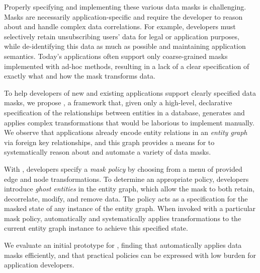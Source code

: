 Properly specifying and implementing these various data masks is challenging. Masks are necessarily
application-specific and require the developer to reason about and handle complex data correlations.
For example, developers must selectively retain unsubscribing users' data for legal or application
purposes, while de-identifying this data as much as possible and maintaining application semantics.
Today's applications often support only coarse-grained masks implemented with ad-hoc methods,
resulting in a lack of a clear specification of exactly what and how the mask transforms data.

To help developers of new and existing applications support clearly specified data masks, we propose
\sys, a framework that, given only a high-level, declarative specification of the relationships
between entities in a database, generates and applies complex transformations that would be
laborious to implement manually. We observe that applications already encode entity
relations in an \emph{entity graph} via foreign key relationships, and this graph provides a means
for \sys to systematically reason about and automate a variety of data masks.

With \sys, developers specify a \emph{mask policy} by choosing from a menu of provided edge and node
transformations. To determine an appropriate policy, developers introduce \emph{ghost entities} in the entity graph, which allow the mask to both retain, decorrelate, modify,
and remove data. The policy acts as a specification for the masked state of any instance of the
entity graph. When invoked with a particular mask policy, \sys automatically and systematically
applies transformations to the current entity graph instance to achieve this specified state.

We evaluate an initial prototype for \sys, finding that \sys automatically applies
data masks efficiently, and that practical policies can be expressed with low burden for application
developers.
\fi

